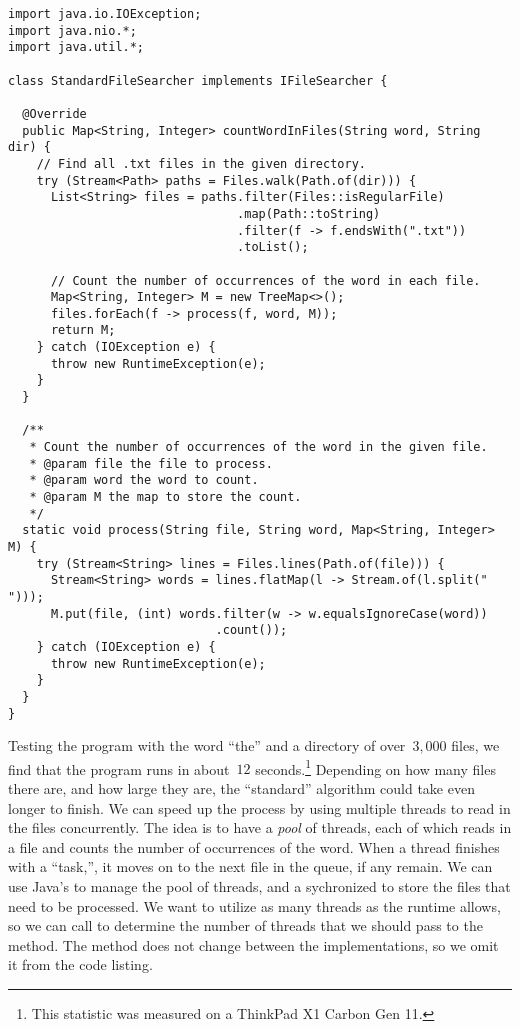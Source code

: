 \begin{lstlisting}[language=MyJava]
import java.io.IOException;
import java.nio.*;
import java.util.*;

class StandardFileSearcher implements IFileSearcher {

  @Override
  public Map<String, Integer> countWordInFiles(String word, String dir) {
    // Find all .txt files in the given directory.
    try (Stream<Path> paths = Files.walk(Path.of(dir))) {
      List<String> files = paths.filter(Files::isRegularFile)
                                .map(Path::toString)
                                .filter(f -> f.endsWith(".txt"))
                                .toList();

      // Count the number of occurrences of the word in each file.
      Map<String, Integer> M = new TreeMap<>();
      files.forEach(f -> process(f, word, M));
      return M;
    } catch (IOException e) {
      throw new RuntimeException(e);
    }
  }

  /**
   * Count the number of occurrences of the word in the given file.
   * @param file the file to process.
   * @param word the word to count.
   * @param M the map to store the count.
   */
  static void process(String file, String word, Map<String, Integer> M) {
    try (Stream<String> lines = Files.lines(Path.of(file))) {
      Stream<String> words = lines.flatMap(l -> Stream.of(l.split(" ")));
      M.put(file, (int) words.filter(w -> w.equalsIgnoreCase(word))
                             .count());
    } catch (IOException e) {
      throw new RuntimeException(e);
    }
  }
}
\end{lstlisting}

Testing the program with the word ``the'' and a directory of over~$3,000$  files, we find that the program runs in about~$12$ seconds.\footnote{This statistic was measured on a ThinkPad X1 Carbon Gen 11.}
Depending on how many files there are, and how large they are, the ``standard'' algorithm could take even longer to finish.
We can speed up the process by using multiple threads to read in the files concurrently.
The idea is to have a \emph{pool} of threads, each of which reads in a file and counts the number of occurrences of the word.
When a thread finishes with a ``task,'', it moves on to the next file in the queue, if any remain.
We can use Java's  to manage the pool of threads, and a sychronized  to store the files that need to be processed.
We want to utilize as many threads as the runtime allows, so we can call  to determine the number of threads that we should pass to the  method.
The  method does not change between the implementations, so we omit it from the code listing.

